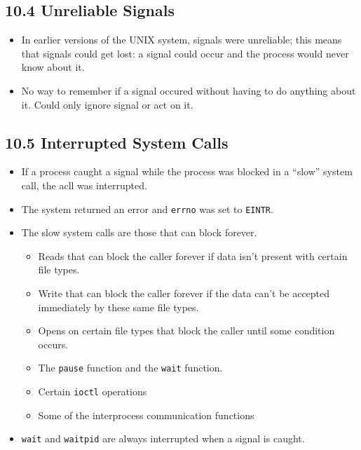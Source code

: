 \documentclass[]{article} \usepackage[all]{xy}
\newcommand{\code}{\texttt}
\begin{document}
\subsection*{10.4 Unreliable Signals}
\begin{itemize}
\item In earlier versions of the UNIX system, signals were unreliable; this
means that signals could get lost: a signal could occur and the process would
never know about it.
\item No way to remember if a signal occured without having to do anything about
it. Could only ignore signal or act on it.
\end{itemize}

\subsection*{10.5 Interrupted System Calls}
\begin{itemize}
\item If a process caught a signal while the process was blocked in a ``slow''
system call, the acll was interrupted.
\item The system returned an error and \code{errno} was set to \code{EINTR}.
\item The slow system calls are those that can block forever.
\begin{itemize}
\item Reads that can block the caller forever if data isn't present with certain
file types.
\item Write that can block the caller forever if the data can't be accepted
immediately by these same file types.
\item Opens on certain file types that block the caller until some condition
occurs.
\item The \code{pause} function and the \code{wait} function.
\item Certain \code{ioctl} operations
\item Some of the interprocess communication functions
\end{itemize}
\item \code{wait} and \code{waitpid} are always interrupted when a signal is
caught.
\end{itemize}
\end{document}
